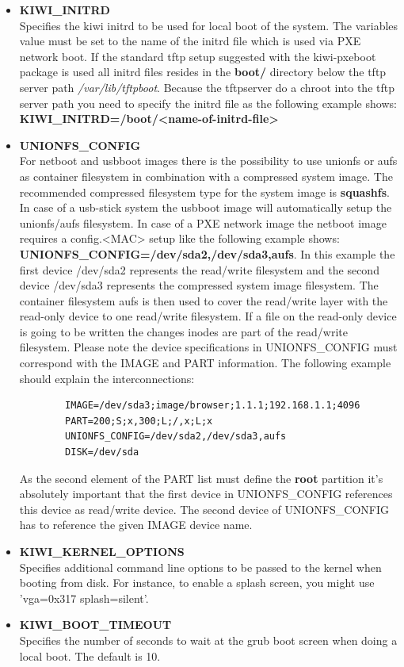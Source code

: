 \begin{itemize}
	\item \textbf{KIWI\_INITRD}\\
        Specifies the kiwi initrd to be used for local boot of the
        system. The variables value must be set to the name of the
        initrd file which is used via PXE network boot. If the
        standard tftp setup suggested with the kiwi-pxeboot package
        is used all initrd files resides in the \textbf{boot/} directory
        below the tftp server path \textit{/var/lib/tftpboot}. Because
        the tftpserver do a chroot into the tftp server path you need
        to specify the initrd file as the following example shows:
        \textbf{KIWI\_INITRD=/boot/<name-of-initrd-file>}
	\item \textbf{UNIONFS\_CONFIG}\\
		For netboot and usbboot images there is the possibility to
		use unionfs or aufs as container filesystem in combination
		with a compressed system image. The recommended compressed
		filesystem type for the system image is \textbf{squashfs}.
		In case of a usb-stick system the usbboot image will 
		automatically setup the unionfs/aufs filesystem. In case of
		a PXE network image the netboot image requires a config.<MAC>
		setup like the following example shows:
		\textbf{UNIONFS\_CONFIG=/dev/sda2,/dev/sda3,aufs}. In this
		example the first device /dev/sda2 represents the read/write
		filesystem and the second device /dev/sda3 represents the
		compressed system image filesystem. The container filesystem
		aufs is then used to cover the read/write layer with the
		read-only device to one read/write filesystem. If a file on
		the read-only device is going to be written the changes inodes
		are part of the read/write filesystem. Please note the device
		specifications in UNIONFS\_CONFIG must correspond with
		the IMAGE and PART information. The following example should
        explain the interconnections:

		\begin{verbatim}
		IMAGE=/dev/sda3;image/browser;1.1.1;192.168.1.1;4096
		PART=200;S;x,300;L;/,x;L;x
		UNIONFS_CONFIG=/dev/sda2,/dev/sda3,aufs
		DISK=/dev/sda
		\end{verbatim}

        As the second element of the PART list must define the \textbf{root}
        partition it's absolutely important that the first device in
        UNIONFS\_CONFIG references this device as read/write device.
        The second device of UNIONFS\_CONFIG has to reference the given
        IMAGE device name.

	\item \textbf{KIWI\_KERNEL\_OPTIONS}\\
		Specifies additional command line options to be passed to
		the kernel when booting from disk.  For instance, to enable
		a splash screen, you might use 'vga=0x317 splash=silent'.
	\item \textbf{KIWI\_BOOT\_TIMEOUT}\\
		Specifies the number of seconds to wait at the grub boot
		screen when doing a local boot.  The default is 10.
\end{itemize}

